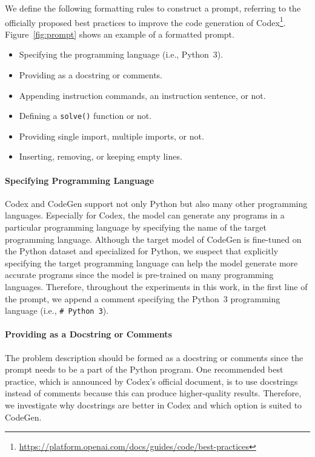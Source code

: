 \documentclass{article}
\begin{document}
We define the following formatting rules to construct a prompt, referring to the officially proposed best practices to improve the code generation of Codex\footnote{\url{https://platform.openai.com/docs/guides/code/best-practices}}.
Figure~\ref{fig:prompt} shows an example of a formatted prompt.


\begin{itemize}
    \item Specifying the programming language (i.e., Python~3).
    \item Providing as a docstring or comments.
    \item Appending instruction commands, an instruction sentence, or not.
    \item Defining a \texttt{solve()} function or not.
    \item Providing single import, multiple imports, or not.
    \item Inserting, removing, or keeping empty lines.
\end{itemize}



\paragraph{Specifying Programming Language}

Codex and CodeGen support not only Python but also many other programming languages.
Especially for Codex, the model can generate any programs in a particular programming language by specifying the name of the target programming language.
Although the target model of CodeGen is fine-tuned on the Python dataset and specialized for Python, we suspect that explicitly specifying the target programming language can help the model generate more accurate programs since the model is pre-trained on many programming languages.
Therefore, throughout the experiments in this work, in the first line of the prompt, we append a comment specifying the Python~3 programming language (i.e., \texttt{\# Python 3}).



\paragraph{Providing as a Docstring or Comments}

The problem description should be formed as a docstring or comments since the prompt needs to be a part of the Python program.
One recommended best practice, which is announced by Codex's official document, is to use docstrings instead of comments because this can produce higher-quality results.
Therefore, we investigate why docstrings are better in Codex and which option is suited to CodeGen.
\end{document}
